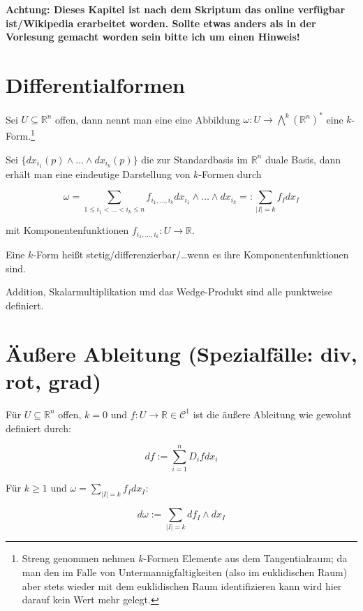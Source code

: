 \textbf{Achtung: Dieses Kapitel ist nach dem Skriptum das online verf\"ugbar ist/Wikipedia erarbeitet worden. Sollte etwas anders als in der Vorlesung gemacht worden sein bitte ich um einen Hinweis!}


\section{Differentialformen}
\begin{definition}[$k$-Form]
	Sei $U\subseteq \mathbb R^n$ offen, dann nennt man eine eine Abbildung $\omega:U \rightarrow \bigwedge^k(\mathbb R^n)^*$ eine $k$-Form.\footnote{Streng genommen nehmen $k$-Formen Elemente aus dem Tangentialraum; da man den im Falle von Untermannigfaltigkeiten (also im euklidischen Raum) aber stets wieder mit dem euklidischen Raum identifizieren kann wird hier darauf kein Wert mehr gelegt.}
\end{definition}
\begin{remark}
	Sei $\{dx_{i_1}(p)\wedge\dots\wedge dx_{i_k}(p)\}$ die zur Standardbasis im $\mathbb R^n$ duale Basis, dann erh\"alt man eine eindeutige Darstellung von $k$-Formen durch
	
	$$\omega = \sum_{1\leq i_1<\dots<i_k\leq n}f_{i_1,\dots,i_k}dx_{i_1}\wedge\dots\wedge dx_{i_k} =: \sum_{|I|=k}f_I dx_I$$
	
	mit Komponentenfunktionen $f_{i_1,\dots,i_k}:U\rightarrow \mathbb R$.
\end{remark}
\begin{definition}
	Eine $k$-Form hei\ss t stetig/differenzierbar/\dots wenn es ihre Komponentenfunktionen sind.
\end{definition}

\begin{definition}
	Addition, Skalarmultiplikation und das Wedge-Produkt sind alle punktweise definiert.
\end{definition}





\section{\"Au\ss ere Ableitung (Spezialf\"alle: div, rot, grad)}
\begin{definition}
	F\"ur $U\subseteq\mathbb R^n$ offen, $k=0$ und $f:U\rightarrow \mathbb R \in \mathcal C^1$ ist die \"au\ss ere Ableitung wie gewohnt definiert durch:

	$$df:=\sum_{i=1}^n D_i fdx_i$$

	F\"ur $k\geq 1$ und $\omega = \sum_{|I|=k}f_I dx_I$:

$$d\omega := \sum_{|I|=k}df_I\wedge dx_I$$
\end{definition}

